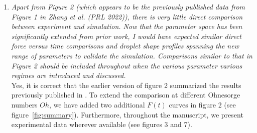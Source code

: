 \documentclass[]{article}
\begin{document}
\begin{enumerate}
	\item \textit{Apart from Figure 2 (which appears to be the previously published data from Figure 1 in Zhang et al. (PRL 2022)), there is very little direct comparison between experiment and simulation. Now that the parameter space has been significantly extended from prior work, I would have expected similar direct force versus time comparisons and droplet shape profiles spanning the new range of parameters to validate the simulation. Comparisons similar to that in Figure 2 should be included throughout when the various parameter various regimes are introduced and discussed.}\\[0.5mm]
	
	Yes, it is correct that the earlier version of figure 2 summarized the results previously published in \citet{zhang2022impact}. To extend the comparison at different Ohnesorge numbers $Oh$, we have added two additional $F(t)$ curves in figure 2 (see figure~\ref{fig:summary}). Furthermore, throughout the manuscript, we present experimental data wherever available (see figures 3 and 7). 


\end{enumerate}
\end{document}
